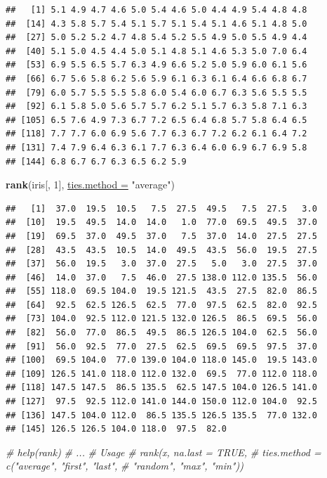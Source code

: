 \documentclass[twoside,symmetric]{book}
\newenvironment{Shaded}{}{}
\newcommand{\CommentTok}[1]{\textit{#1}}
\newcommand{\DataTypeTok}[1]{\underline{#1}}
\newcommand{\DecValTok}[1]{#1}
\newcommand{\KeywordTok}[1]{\textbf{#1}}
\newcommand{\NormalTok}[1]{#1}
\newcommand{\StringTok}[1]{#1}
\begin{document}
\begin{verbatim}
##   [1] 5.1 4.9 4.7 4.6 5.0 5.4 4.6 5.0 4.4 4.9 5.4 4.8 4.8
##  [14] 4.3 5.8 5.7 5.4 5.1 5.7 5.1 5.4 5.1 4.6 5.1 4.8 5.0
##  [27] 5.0 5.2 5.2 4.7 4.8 5.4 5.2 5.5 4.9 5.0 5.5 4.9 4.4
##  [40] 5.1 5.0 4.5 4.4 5.0 5.1 4.8 5.1 4.6 5.3 5.0 7.0 6.4
##  [53] 6.9 5.5 6.5 5.7 6.3 4.9 6.6 5.2 5.0 5.9 6.0 6.1 5.6
##  [66] 6.7 5.6 5.8 6.2 5.6 5.9 6.1 6.3 6.1 6.4 6.6 6.8 6.7
##  [79] 6.0 5.7 5.5 5.5 5.8 6.0 5.4 6.0 6.7 6.3 5.6 5.5 5.5
##  [92] 6.1 5.8 5.0 5.6 5.7 5.7 6.2 5.1 5.7 6.3 5.8 7.1 6.3
## [105] 6.5 7.6 4.9 7.3 6.7 7.2 6.5 6.4 6.8 5.7 5.8 6.4 6.5
## [118] 7.7 7.7 6.0 6.9 5.6 7.7 6.3 6.7 7.2 6.2 6.1 6.4 7.2
## [131] 7.4 7.9 6.4 6.3 6.1 7.7 6.3 6.4 6.0 6.9 6.7 6.9 5.8
## [144] 6.8 6.7 6.7 6.3 6.5 6.2 5.9
\end{verbatim}

\begin{Shaded}
\begin{Highlighting}[]
\KeywordTok{rank}\NormalTok{(iris[, }\DecValTok{1}\NormalTok{], }\DataTypeTok{ties.method =} \StringTok{"average"}\NormalTok{)}
\end{Highlighting}
\end{Shaded}

\begin{verbatim}
##   [1]  37.0  19.5  10.5   7.5  27.5  49.5   7.5  27.5   3.0
##  [10]  19.5  49.5  14.0  14.0   1.0  77.0  69.5  49.5  37.0
##  [19]  69.5  37.0  49.5  37.0   7.5  37.0  14.0  27.5  27.5
##  [28]  43.5  43.5  10.5  14.0  49.5  43.5  56.0  19.5  27.5
##  [37]  56.0  19.5   3.0  37.0  27.5   5.0   3.0  27.5  37.0
##  [46]  14.0  37.0   7.5  46.0  27.5 138.0 112.0 135.5  56.0
##  [55] 118.0  69.5 104.0  19.5 121.5  43.5  27.5  82.0  86.5
##  [64]  92.5  62.5 126.5  62.5  77.0  97.5  62.5  82.0  92.5
##  [73] 104.0  92.5 112.0 121.5 132.0 126.5  86.5  69.5  56.0
##  [82]  56.0  77.0  86.5  49.5  86.5 126.5 104.0  62.5  56.0
##  [91]  56.0  92.5  77.0  27.5  62.5  69.5  69.5  97.5  37.0
## [100]  69.5 104.0  77.0 139.0 104.0 118.0 145.0  19.5 143.0
## [109] 126.5 141.0 118.0 112.0 132.0  69.5  77.0 112.0 118.0
## [118] 147.5 147.5  86.5 135.5  62.5 147.5 104.0 126.5 141.0
## [127]  97.5  92.5 112.0 141.0 144.0 150.0 112.0 104.0  92.5
## [136] 147.5 104.0 112.0  86.5 135.5 126.5 135.5  77.0 132.0
## [145] 126.5 126.5 104.0 118.0  97.5  82.0
\end{verbatim}

\begin{Shaded}
\begin{Highlighting}[]
\CommentTok{# help(rank)}
\CommentTok{# ...}
\CommentTok{# Usage}
\CommentTok{# rank(x, na.last = TRUE,}
\CommentTok{#     ties.method = c("average", "first", "last", }
\CommentTok{#       "random", "max", "min"))}
\end{Highlighting}
\end{Shaded}
\end{document}
